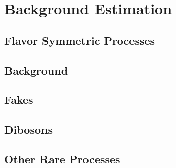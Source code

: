 
\chapter{Background Estimation} %

\label{ch:backgrounds} 


\section{Flavor Symmetric Processes}
\label{sec:bg-fs}



\section{\dyjets Background}
\label{sec:bg-z}

\section{Fakes}
\label{sec:bg-fake}

\section{Dibosons}
\label{sec:bg-diboson}

\section{Other Rare Processes}
\label{sec:bg-other}
